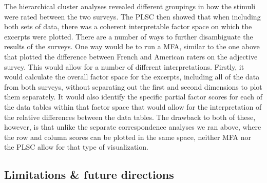 \documentclass[
  english,
  man,floatsintext]{apa6}
\begin{document}
The hierarchical cluster analyses revealed different groupings in how the stimuli were rated between the two surveys. The PLSC then showed that when including both sets of data, there was a coherent interpretable factor space on which the excerpts were plotted. There are a number of ways to further disambiguate the results of the surveys. One way would be to run a MFA, similar to the one above that plotted the difference between French and American raters on the adjective survey. This would allow for a number of different interpretations. Firstly, it would calculate the overall factor space for the excerpts, including all of the data from both surveys, without separating out the first and second dimensions to plot them separately. It would also identify the specific partial factor scores for each of the data tables within that factor space that would allow for the interpretation of the relative differences between the data tables. The drawback to both of these, however, is that unlike the separate correspondence analyses we ran above, where the row and column scores can be plotted in the same space, neither MFA nor the PLSC allow for that type of visualization.

\hypertarget{limitations-future-directions}{%
\subsection{Limitations \& future directions}\label{limitations-future-directions}}
\end{document}
